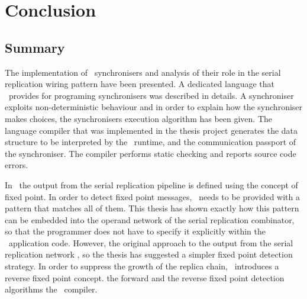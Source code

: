 \chapter{Conclusion} \label{concl}
    \section{Summary}
The implementation of \ak\ synchronisers and analysis of their role in the serial replication wiring pattern have been presented. A dedicated language that \ak\ provides for programing synchronisers was described in details. A synchroniser exploits non-deterministic behaviour and in order to explain how the synchroniser makes choices, the synchronisers execution algorithm has been given. The language compiler that was implemented in the thesis project generates the data structure to be interpreted by the \ak\ runtime, and the communication passport of the synchroniser. The compiler performs static checking and reports source code errors.

In \ak\ the output from the serial replication pipeline is defined using the concept of fixed point. In order to detect fixed point messages, \ak\ needs to be provided with a pattern that matches all of them. This thesis has shown exactly how this pattern can be embedded into the operand network of the serial replication combinator, so that the programmer does not have to specify it explicitly within the \ak\ application code. However, the original approach to the output from the serial replication network , so the thesis has suggested a simpler fixed point detection strategy. In order to suppress the growth of the replica chain, \ak\ introduces a reverse fixed point concept.   the forward and the reverse fixed point detection algorithms  the \ak\ compiler.



